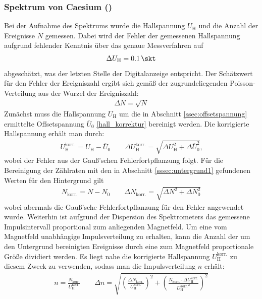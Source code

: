 \documentclass[11pt, a4paper]{article}
\numberwithin{equation}{section}
\begin{document}
\subsubsection{Spektrum von Caesium ()}
\label{sssec:spektrum_caesium}
Bei der Aufnahme des Spektrums wurde die Hallspannung $U_\mathrm{H}$ und die Anzahl der Ereignisse $N$ gemessen.
Dabei wird der Fehler der gemessenen Hallspannung aufgrund fehlender Kenntnis über das genaue Messverfahren auf
\begin{align}
	\Delta U_\mathrm{H} = \SI{0.1}{\skt}
\end{align}
abgeschätzt, was der letzten Stelle der Digitalanzeige entspricht.
Der Schätzwert für den Fehler der Ereigniszahl ergibt sich gemäß der zugrundeliegenden Poisson-Verteilung aus der Wurzel der Ereigniszahl:
\begin{align}
	\Delta N = \sqrt{N}
\end{align}
Zunächst muss die Hallspannung $U_\mathrm{H}$ um die in Abschnitt \ref{ssec:offsetspannung} ermittelte Offsetspannung $\overline{U}_0$ \eqref{hall_korrektur} bereinigt werden.
Die korrigierte Hallspannung erhält man durch:
\begin{align}
U_\mathrm{H}^\mathrm{korr.} = U_\mathrm{H} - \overline{U}_0 \qquad
\Delta U_\mathrm{H}^\mathrm{korr.} = \sqrt{\Delta U_\mathrm{H}^2 + \Delta \overline{U}_0^2} \text{,}
\end{align}
wobei der Fehler aus der Gauß'schen Fehlerfortpflanzung folgt.
Für die Bereinigung der Zählraten mit den in Abschnitt \ref{sssec:untergrund1} gefundenen Werten für den Hintergrund gilt
\begin{align}
	N_\mathrm{korr.} = N - N_0 \qquad \Delta N_\mathrm{korr.} = \sqrt{\Delta N^2 + \Delta N_0^2}
\end{align}
wobei abermals die Gauß'sche Fehlerfortpflanzung für den Fehler angewendet wurde.
Weiterhin ist aufgrund der Dispersion des Spektrometers das gemessene Impulsintervall proportional zum anliegenden Magnetfeld.
Um eine vom Magnetfeld unabhängige Impulsverteilung zu erhalten, kann die Anzahl der um den Untergrund bereinigten Ereignisse durch eine zum Magnetfeld proportionale Größe dividiert werden.
Es liegt nahe die korrigierte Hallspannung $U_\mathrm{H}^\mathrm{korr.}$ zu diesem Zweck zu verwenden, sodass man die Impulsverteilung $n$ erhält:
\begin{align}
	n = \frac{N_\mathrm{korr.}}{U_\mathrm{H}^\mathrm{korr.}} \qquad \Delta n = \sqrt{\left( \frac{\Delta N_\mathrm{korr.}}{U_\mathrm{H}^\mathrm{korr.}}\right)^2 + \left( \frac{N_\mathrm{korr.} \cdot \Delta U_\mathrm{H}^\mathrm{korr.}}{ {U_\mathrm{H}^\mathrm{korr.}}^2 }\right)^2}
\end{align}
\end{document}
